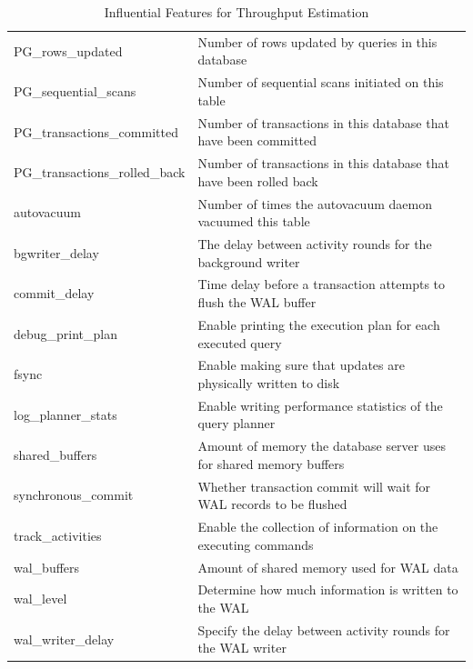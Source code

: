 \begin{table}
{\begin{tabular}{ll}
      PG\_rows\_updated              & Number of rows updated by queries in this database                  \\
      PG\_sequential\_scans          & Number of sequential scans initiated on this table                  \\
      PG\_transactions\_committed    & Number of transactions in this database that have been committed    \\
      PG\_transactions\_rolled\_back & Number of transactions in this database that have been rolled back  \\
      autovacuum                     & Number of times the autovacuum daemon vacuumed this table           \\
      bgwriter\_delay                & The delay between activity rounds for the background writer         \\
      commit\_delay                  & Time delay before a transaction attempts to flush the WAL buffer    \\
      debug\_print\_plan             & Enable printing the execution plan for each executed query          \\
      fsync                          & Enable making sure that updates are physically written to disk      \\
      log\_planner\_stats            & Enable writing performance statistics of the query planner          \\
      shared\_buffers                & Amount of memory the database server uses for shared memory buffers \\
      synchronous\_commit            & Whether transaction commit will wait for WAL records to be flushed  \\
      track\_activities              & Enable the collection of information on the executing commands      \\
      wal\_buffers                   & Amount of shared memory used for WAL data                           \\
      wal\_level                     & Determine how much information is written to the WAL                \\
      wal\_writer\_delay             & Specify the delay between activity rounds for the WAL writer        \\
      \bottomrule
    \end{tabular}
  }
  \caption{Influential Features for Throughput Estimation}
  \label{tab:influential_features_for_throughput}
\end{table}

